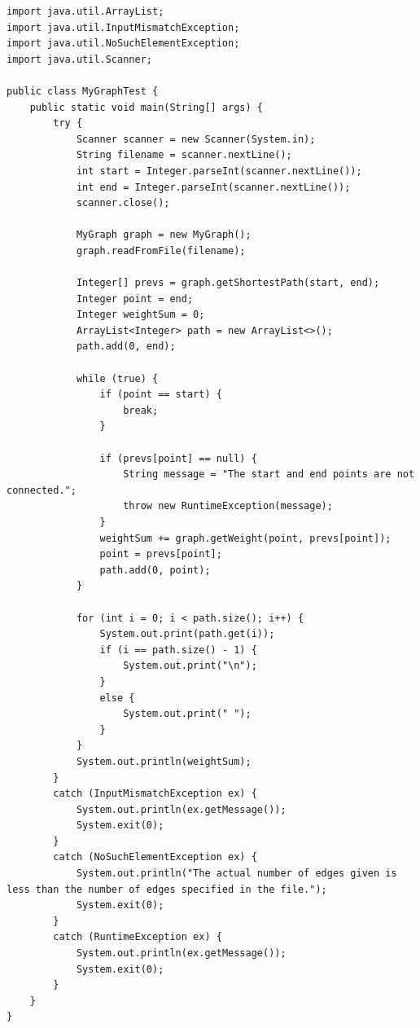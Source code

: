 \documentclass[a4j]{jarticle}
\begin{document}
\begin{lstlisting}[caption=MyGraphTest.java]
import java.util.ArrayList;
import java.util.InputMismatchException;
import java.util.NoSuchElementException;
import java.util.Scanner;

public class MyGraphTest {
    public static void main(String[] args) {
        try {
            Scanner scanner = new Scanner(System.in);
            String filename = scanner.nextLine();
            int start = Integer.parseInt(scanner.nextLine());
            int end = Integer.parseInt(scanner.nextLine());
            scanner.close();

            MyGraph graph = new MyGraph();
            graph.readFromFile(filename);

            Integer[] prevs = graph.getShortestPath(start, end);
            Integer point = end;
            Integer weightSum = 0;
            ArrayList<Integer> path = new ArrayList<>();
            path.add(0, end);

            while (true) {
                if (point == start) {
                    break;
                }

                if (prevs[point] == null) {
                    String message = "The start and end points are not connected.";
                    throw new RuntimeException(message);
                }
                weightSum += graph.getWeight(point, prevs[point]);
                point = prevs[point];
                path.add(0, point);
            }

            for (int i = 0; i < path.size(); i++) {
                System.out.print(path.get(i));
                if (i == path.size() - 1) {
                    System.out.print("\n");
                }
                else {
                    System.out.print(" ");
                }
            }
            System.out.println(weightSum);
        }
        catch (InputMismatchException ex) {
            System.out.println(ex.getMessage());
            System.exit(0);
        }
        catch (NoSuchElementException ex) {
            System.out.println("The actual number of edges given is less than the number of edges specified in the file.");
            System.exit(0);
        }
        catch (RuntimeException ex) {
            System.out.println(ex.getMessage());
            System.exit(0);
        }
    }
}  
\end{lstlisting}
\end{document}
